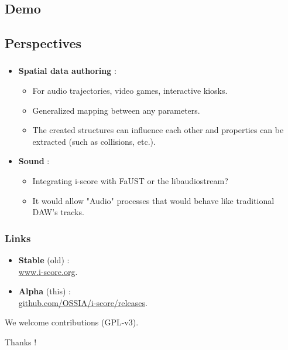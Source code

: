 \documentclass[12pt,t]{beamer}
\makeatletter
\newcommand*{\currentname}{\@currentlabelname}
\makeatother
\begin{document}
\subsection{Demo}


\subsection{Perspectives}
\begin{frame}
    \frametitle{\currentname}
    \begin{itemize}
        \item \textbf{Spatial data authoring} :
        
        \begin{itemize}
            \item For audio trajectories, video games, interactive kiosks.
            \item Generalized mapping between any parameters. 
            \item The created structures can influence each other and properties can be 
            extracted (such as collisions, etc.).
        \end{itemize}
        
        \item \textbf{Sound} : 
        \begin{itemize}
            \item Integrating i-score with FaUST or the libaudiostream?
            \item It would allow "Audio" processes that would behave like traditional DAW's tracks.
        \end{itemize}
    \end{itemize}
\end{frame}

\begin{frame}
    \frametitle{Links}
    \begin{itemize}
        \item \textbf{Stable} (old) :~\\ \url{www.i-score.org}.
        \item \textbf{Alpha} (this) :~\\ \url{github.com/OSSIA/i-score/releases}. 
    \end{itemize}
    
    We welcome contributions (GPL-v3).
    
    \centering
    \vspace{2cm}
    \Large{Thanks !}
\end{frame}
\end{document}
